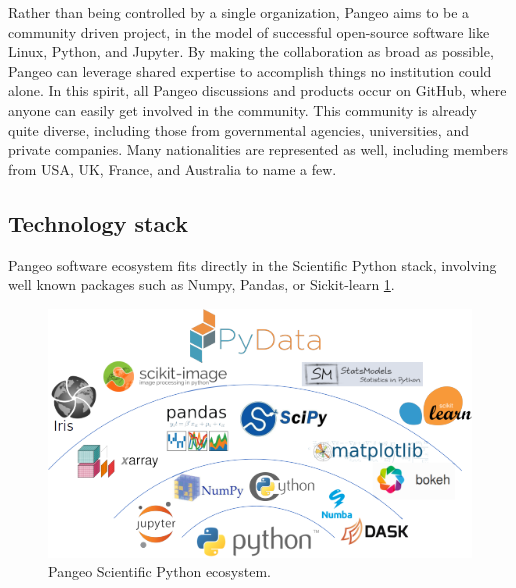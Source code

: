 \documentclass{article}
\begin{document}
Rather than being controlled by a single organization, Pangeo aims to be a community driven project, in the model of successful open-source software like Linux, Python, and Jupyter. By making the collaboration as broad as possible, Pangeo can leverage shared expertise to accomplish things no institution could alone. In this spirit, all Pangeo discussions and products occur on GitHub\cite{b3}, where anyone can easily get involved in the community.
This community is already quite diverse, including those from governmental agencies, universities, and private companies. Many nationalities are represented as well, including members from USA, UK, France, and Australia to name a few.


\subsection{Technology stack}
\label{ssec:techstack}

Pangeo software ecosystem fits directly in the Scientific Python stack, involving well known packages such as Numpy, Pandas, or Sickit-learn \ref{scipy_stack}.

\begin{figure}
  \centering
  \includegraphics[width=\columnwidth]{pangeo_python_stack.png}
  \caption{\label{scipy_stack} Pangeo Scientific Python ecosystem.}
\end{figure}
\end{document}
